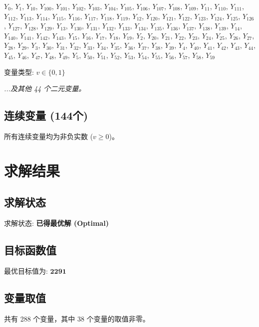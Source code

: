 \documentclass[a4paper,10pt]{article}
\begin{document}
{\small $Y_{0}$, $Y_{1}$, $Y_{10}$, $Y_{100}$, $Y_{101}$, $Y_{102}$, $Y_{103}$, $Y_{104}$, $Y_{105}$, $Y_{106}$, $Y_{107}$, $Y_{108}$, $Y_{109}$, $Y_{11}$, $Y_{110}$, $Y_{111}$, $Y_{112}$, $Y_{113}$, $Y_{114}$, $Y_{115}$, $Y_{116}$, $Y_{117}$, $Y_{118}$, $Y_{119}$, $Y_{12}$, $Y_{120}$, $Y_{121}$, $Y_{122}$, $Y_{123}$, $Y_{124}$, $Y_{125}$, $Y_{126}$, $Y_{127}$, $Y_{128}$, $Y_{129}$, $Y_{13}$, $Y_{130}$, $Y_{131}$, $Y_{132}$, $Y_{133}$, $Y_{134}$, $Y_{135}$, $Y_{136}$, $Y_{137}$, $Y_{138}$, $Y_{139}$, $Y_{14}$, $Y_{140}$, $Y_{141}$, $Y_{142}$, $Y_{143}$, $Y_{15}$, $Y_{16}$, $Y_{17}$, $Y_{18}$, $Y_{19}$, $Y_{2}$, $Y_{20}$, $Y_{21}$, $Y_{22}$, $Y_{23}$, $Y_{24}$, $Y_{25}$, $Y_{26}$, $Y_{27}$, $Y_{28}$, $Y_{29}$, $Y_{3}$, $Y_{30}$, $Y_{31}$, $Y_{32}$, $Y_{33}$, $Y_{34}$, $Y_{35}$, $Y_{36}$, $Y_{37}$, $Y_{38}$, $Y_{39}$, $Y_{4}$, $Y_{40}$, $Y_{41}$, $Y_{42}$, $Y_{43}$, $Y_{44}$, $Y_{45}$, $Y_{46}$, $Y_{47}$, $Y_{48}$, $Y_{49}$, $Y_{5}$, $Y_{50}$, $Y_{51}$, $Y_{52}$, $Y_{53}$, $Y_{54}$, $Y_{55}$, $Y_{56}$, $Y_{57}$, $Y_{58}$, $Y_{59}$}

变量类型: $v \in \{0,1\}$

\textit{...及其他 44 个二元变量。}

\subsection{连续变量 (144个)}

所有连续变量均为非负实数 ($v \geq 0$)。

\section{求解结果}

\subsection{求解状态}

求解状态: \textbf{已得最优解 (Optimal)}

\subsection{目标函数值}

最优目标值为: $\mathbf{2291}$

\subsection{变量取值}

共有 288 个变量，其中 38 个变量的取值非零。
\end{document}
